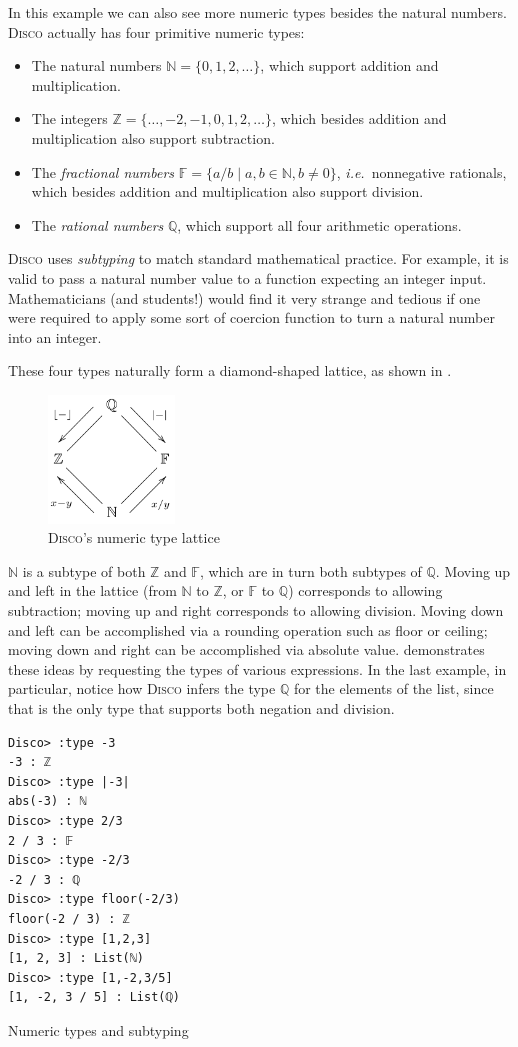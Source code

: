 \documentclass[submission,copyright,creativecommons]{eptcs}
\newcommand{\disco}{\textsc{Disco}\xspace}
\newcommand{\ie}{\emph{i.e.}\ }
\newcommand{\pref}[1]{\prettyref{#1}}
\newcommand{\N}{\mathbb{N}}
\newcommand{\Z}{\mathbb{Z}}
\newcommand{\F}{\mathbb{F}}
\newcommand{\Q}{\mathbb{Q}}
\begin{document}
In this example we can also see more numeric types besides the natural
numbers.  \disco actually has four primitive numeric types:
\begin{itemize}
\item The natural numbers $\N = \{0, 1, 2, \dots\}$, which support
  addition and multiplication.
\item The integers $\Z = \{\dots, -2, -1, 0, 1, 2, \dots\}$, which
  besides addition and multiplication also support subtraction.
\item The \emph{fractional numbers} $\F = \{ a/b \mid a, b \in \N, b
  \neq 0 \}$, \ie nonnegative rationals, which besides addition and
  multiplication also support division.
\item The \emph{rational numbers} $\Q$, which support all four
  arithmetic operations.
\end{itemize}

\disco uses \emph{subtyping} to match standard mathematical practice.
For example, it is valid to pass a natural number value to a function
expecting an integer input.  Mathematicians (and students!) would find
it very strange and tedious if one were required to apply some sort of
coercion function to turn a natural number into an integer.

These four types naturally form a diamond-shaped lattice, as shown in
\pref{fig:lattice}.
\begin{figure}[htp]
  \centering
  \includegraphics[width=0.3\textwidth]{../../docs/images/diamond.png}
  \caption{\disco's numeric type lattice}
  \label{fig:lattice}
\end{figure}
$\N$ is a subtype of both $\Z$ and $\F$, which are in turn both
subtypes of $\Q$.  Moving up and left in the lattice (from $\N$ to
$\Z$, or $\F$ to $\Q$) corresponds to allowing subtraction; moving up
and right corresponds to allowing division.  Moving down and left can
be accomplished via a rounding operation such as floor or ceiling;
moving down and right can be accomplished via absolute
value. \pref{lst:subtype} demonstrates these ideas by requesting the
types of various expressions.  In the last example, in particular,
notice how \disco infers the type $\Q$ for the elements of the list,
since that is the only type that supports both negation and division.
\begin{listing}
\begin{verbatim}
Disco> :type -3
-3 : ℤ
Disco> :type |-3|
abs(-3) : ℕ
Disco> :type 2/3
2 / 3 : 𝔽
Disco> :type -2/3
-2 / 3 : ℚ
Disco> :type floor(-2/3)
floor(-2 / 3) : ℤ
Disco> :type [1,2,3]
[1, 2, 3] : List(ℕ)
Disco> :type [1,-2,3/5]
[1, -2, 3 / 5] : List(ℚ)
\end{verbatim}
\caption{Numeric types and subtyping}
\label{lst:subtype}
\end{listing}
\end{document}
